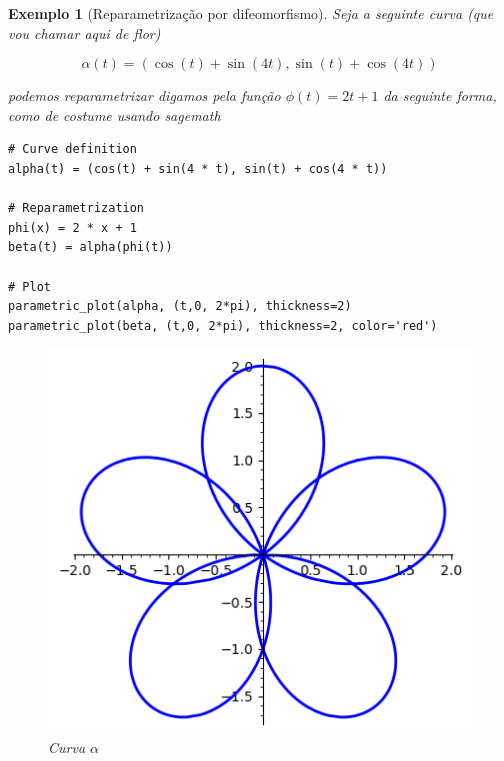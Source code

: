 \documentclass[12pt]{article}
\newtheorem{ex}{Exemplo}[section]
\begin{document}
\begin{ex}[Reparametrização por difeomorfismo]
Seja a seguinte curva (que vou chamar aqui de flor)

$$\alpha(t) = (\cos(t) + \sin(4 t), \sin(t) + \cos(4 t))$$

podemos reparametrizar digamos pela função $\phi(t) = 2 t + 1$ da seguinte forma, como de costume usando \textit{sagemath}

\begin{lstlisting}
# Curve definition
alpha(t) = (cos(t) + sin(4 * t), sin(t) + cos(4 * t))

# Reparametrization
phi(x) = 2 * x + 1
beta(t) = alpha(phi(t))

# Plot
parametric_plot(alpha, (t,0, 2*pi), thickness=2)
parametric_plot(beta, (t,0, 2*pi), thickness=2, color='red')
\end{lstlisting}

\begin{figure}[H]
    \centering
    \includegraphics[scale=.6]{Images/ex2.1-1.png}
    \caption{Curva $\alpha$}
    \label{fig:ex2.1-1}
\end{figure}


\end{ex}
\end{document}
